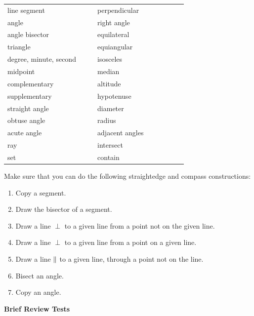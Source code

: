 \documentclass[11pt]{book}
\begin{document}
\begin{center}
\begin{tabular}{@{}p{0.42\linewidth}p{0.42\linewidth}@{}}
line segment            & perpendicular    \\
angle                   & right angle      \\
angle bisector          & equilateral      \\
triangle                & equiangular      \\
degree, minute, second  & isosceles        \\
midpoint                & median           \\
complementary           & altitude         \\
supplementary           & hypotenuse       \\
straight angle          & diameter         \\
obtuse angle            & radius           \\
acute angle             & adjacent angles  \\
ray                     & intersect        \\
set                     & contain          \\
\end{tabular}
\end{center}

\begin{exlist}\setcounter{exlisti}{1}
\item Make sure that you can do the following straightedge and compass
      constructions:
  \begin{enumerate}[label=(\alph*), leftmargin=2.2em, itemsep=1pt, topsep=2pt]
  \item Copy a segment.
  \item Draw the bisector of a segment.
  \item Draw a line $\perp$ to a given line from a point not on the given line.
  \item Draw a line $\perp$ to a given line from a point on a given line.
  \item Draw a line $\mathrel{\|}$ to a given line, through a point not on the line.
  \item Bisect an angle.
  \item Copy an angle.
  \end{enumerate}
\end{exlist}

\begin{center}\bfseries Brief Review Tests\end{center}
\nopagebreak
\end{document}
